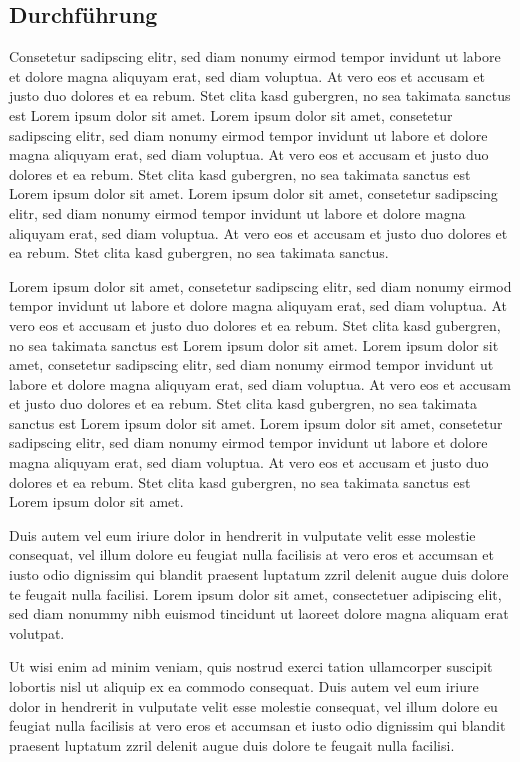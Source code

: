 \subsection*{Durchführung}

	Consetetur sadipscing elitr, sed diam nonumy eirmod tempor invidunt ut labore et dolore magna aliquyam erat, sed diam voluptua.
	At vero eos et accusam et justo duo dolores et ea rebum.
	Stet clita kasd gubergren, no sea takimata sanctus est Lorem ipsum dolor sit amet.
	Lorem ipsum dolor sit amet, consetetur sadipscing elitr, sed diam nonumy eirmod tempor invidunt ut labore et dolore magna aliquyam erat, sed diam voluptua.
	At vero eos et accusam et justo duo dolores et ea rebum.
	Stet clita kasd gubergren, no sea takimata sanctus est Lorem ipsum dolor sit amet.
	Lorem ipsum dolor sit amet, consetetur sadipscing elitr, sed diam nonumy eirmod tempor invidunt ut labore et dolore magna aliquyam erat, sed diam voluptua.
	At vero eos et accusam et justo duo dolores et ea rebum.
	Stet clita kasd gubergren, no sea takimata sanctus.
	
	Lorem ipsum dolor sit amet, consetetur sadipscing elitr, sed diam nonumy eirmod tempor invidunt ut labore et dolore magna aliquyam erat, sed diam voluptua.
	At vero eos et accusam et justo duo dolores et ea rebum.
	Stet clita kasd gubergren, no sea takimata sanctus est Lorem ipsum dolor sit amet.
	Lorem ipsum dolor sit amet, consetetur sadipscing elitr, sed diam nonumy eirmod tempor invidunt ut labore et dolore magna aliquyam erat, sed diam voluptua.
	At vero eos et accusam et justo duo dolores et ea rebum.
	Stet clita kasd gubergren, no sea takimata sanctus est Lorem ipsum dolor sit amet.
	Lorem ipsum dolor sit amet, consetetur sadipscing elitr, sed diam nonumy eirmod tempor invidunt ut labore et dolore magna aliquyam erat, sed diam voluptua.
	At vero eos et accusam et justo duo dolores et ea rebum.
	Stet clita kasd gubergren, no sea takimata sanctus est Lorem ipsum dolor sit amet.
	
	Duis autem vel eum iriure dolor in hendrerit in vulputate velit esse molestie consequat, vel illum dolore eu feugiat nulla facilisis at vero eros et accumsan et iusto odio dignissim qui blandit praesent luptatum zzril delenit augue duis dolore te feugait nulla facilisi.
	Lorem ipsum dolor sit amet, consectetuer adipiscing elit, sed diam nonummy nibh euismod tincidunt ut laoreet dolore magna aliquam erat volutpat.
	
	Ut wisi enim ad minim veniam, quis nostrud exerci tation ullamcorper suscipit lobortis nisl ut aliquip ex ea commodo consequat.
	Duis autem vel eum iriure dolor in hendrerit in vulputate velit esse molestie consequat, vel illum dolore eu feugiat nulla facilisis at vero eros et accumsan et iusto odio dignissim qui blandit praesent luptatum zzril delenit augue duis dolore te feugait nulla facilisi.
	